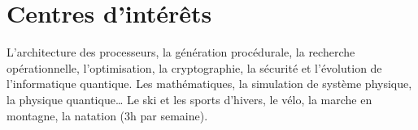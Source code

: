 \documentclass[a4paper,10pt,sans]{moderncv}
\renewcommand{\deletedSpace}{-2mm}
\begin{document}

	\vspace*{\deletedSpace}
	\printbibliography[title=Publications]{}


	\vspace*{\deletedSpace}
	\section{Centres d'intérêts}
			{L'architecture des processeurs, la génération procédurale, la recherche opérationnelle, l'optimisation, la cryptographie, la sécurité et l'évolution de l'informatique quantique.}
			{Les mathématiques, la simulation de système physique, la physique quantique\ldots}
			{Le ski et les sports d'hivers, le vélo, la marche en montagne, la natation (3h par semaine).}
\end{document}
